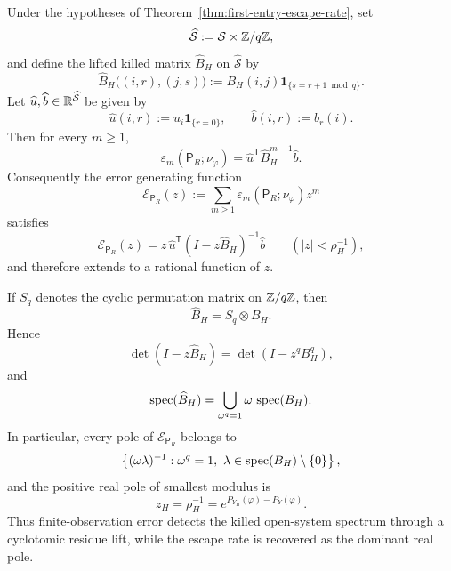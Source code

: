 \begin{theorem}
\label{thm:error-resolvent-cyclotomic}
Under the hypotheses of
Theorem~\ref{thm:first-entry-escape-rate}, set
\[
  \widehat{\mathcal S}:=\mathcal S\times \mathbb{Z}/q\mathbb{Z},
\]
and define the lifted killed matrix \(\widehat B_H\) on
\(\widehat{\mathcal S}\) by
\[
  \widehat B_H\bigl((i,r),(j,s)\bigr)
  := B_H(i,j)\mathbf{1}_{\{s=r+1\bmod q\}}.
\]
Let \(\widehat u,\widehat b\in\mathbb{R}^{\widehat{\mathcal S}}\) be given by
\[
  \widehat u(i,r):=u_i\mathbf{1}_{\{r=0\}},
  \qquad
  \widehat b(i,r):=b_r(i).
\]
Then for every \(m\geq 1\),
\[
  \varepsilon_m(\mathsf{P}_R;\nu_\varphi)
  = \widehat u^{\mathsf T}\widehat B_H^{m-1}\widehat b.
\]
Consequently the error generating function
\[
  \mathcal E_{\mathsf{P}_R}(z)
  := \sum_{m\geq 1}
      \varepsilon_m(\mathsf{P}_R;\nu_\varphi)z^m
\]
satisfies
\[
  \mathcal E_{\mathsf{P}_R}(z)
  = z\,\widehat u^{\mathsf T}
      (I-z\widehat B_H)^{-1}\widehat b
  \qquad (|z|<\rho_H^{-1}),
\]
and therefore extends to a rational function of \(z\).

If \(S_q\) denotes the cyclic permutation matrix on \(\mathbb{Z}/q\mathbb{Z}\), then
\[
  \widehat B_H=S_q\otimes B_H.
\]
Hence
\[
  \det(I-z\widehat B_H)=\det(I-z^q B_H^q),
\]
and
\[
  \operatorname{spec}(\widehat B_H)
  = \bigcup_{\omega^q=1}\omega\,\operatorname{spec}(B_H).
\]
In particular, every pole of \(\mathcal E_{\mathsf{P}_R}\) belongs to
\[
  \left\{(\omega\lambda)^{-1}:
       \omega^q=1,\ \lambda\in\operatorname{spec}(B_H)\setminus\{0\}\right\},
\]
and the positive real pole of smallest modulus is
\[
  z_H=\rho_H^{-1}=e^{P_{Y_H}(\varphi)-P_Y(\varphi)}.
\]
Thus finite-observation error detects the killed open-system spectrum
through a cyclotomic residue lift, while the escape rate is recovered as
the dominant real pole.
\end{theorem}

